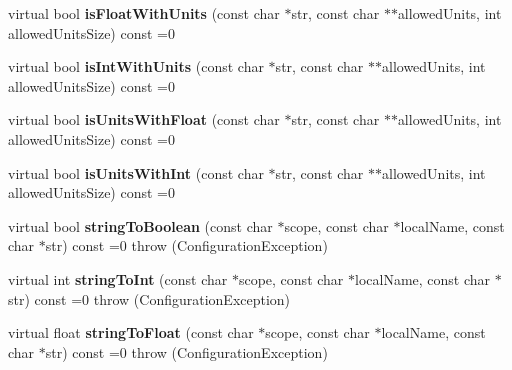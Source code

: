\begin{DoxyCompactItemize}
\item 
\hypertarget{classCONFIG4CPP__NAMESPACE_1_1Configuration_ad50807b263087f742816a6092bb72e14}{virtual bool {\bfseries is\-Float\-With\-Units} (const char $\ast$str, const char $\ast$$\ast$allowed\-Units, int allowed\-Units\-Size) const =0}\label{classCONFIG4CPP__NAMESPACE_1_1Configuration_ad50807b263087f742816a6092bb72e14}

\item 
\hypertarget{classCONFIG4CPP__NAMESPACE_1_1Configuration_a08a300bc4cee2f0f42d05911641124d6}{virtual bool {\bfseries is\-Int\-With\-Units} (const char $\ast$str, const char $\ast$$\ast$allowed\-Units, int allowed\-Units\-Size) const =0}\label{classCONFIG4CPP__NAMESPACE_1_1Configuration_a08a300bc4cee2f0f42d05911641124d6}

\item 
\hypertarget{classCONFIG4CPP__NAMESPACE_1_1Configuration_af132131731f7e2c4910d124b4de1152e}{virtual bool {\bfseries is\-Units\-With\-Float} (const char $\ast$str, const char $\ast$$\ast$allowed\-Units, int allowed\-Units\-Size) const =0}\label{classCONFIG4CPP__NAMESPACE_1_1Configuration_af132131731f7e2c4910d124b4de1152e}

\item 
\hypertarget{classCONFIG4CPP__NAMESPACE_1_1Configuration_a845b2bdfc6a74f1524750d0e002fa155}{virtual bool {\bfseries is\-Units\-With\-Int} (const char $\ast$str, const char $\ast$$\ast$allowed\-Units, int allowed\-Units\-Size) const =0}\label{classCONFIG4CPP__NAMESPACE_1_1Configuration_a845b2bdfc6a74f1524750d0e002fa155}

\item 
\hypertarget{classCONFIG4CPP__NAMESPACE_1_1Configuration_a80f6dcd2137e1fe9672a18d8ed6c22dd}{virtual bool {\bfseries string\-To\-Boolean} (const char $\ast$scope, const char $\ast$local\-Name, const char $\ast$str) const =0  throw (\-Configuration\-Exception)}\label{classCONFIG4CPP__NAMESPACE_1_1Configuration_a80f6dcd2137e1fe9672a18d8ed6c22dd}

\item 
\hypertarget{classCONFIG4CPP__NAMESPACE_1_1Configuration_a1993b784e8ac66c63dcb9ac802661dfd}{virtual int {\bfseries string\-To\-Int} (const char $\ast$scope, const char $\ast$local\-Name, const char $\ast$str) const =0  throw (\-Configuration\-Exception)}\label{classCONFIG4CPP__NAMESPACE_1_1Configuration_a1993b784e8ac66c63dcb9ac802661dfd}

\item 
\hypertarget{classCONFIG4CPP__NAMESPACE_1_1Configuration_af8ce9732bcd6a7079179b98aaaf764fc}{virtual float {\bfseries string\-To\-Float} (const char $\ast$scope, const char $\ast$local\-Name, const char $\ast$str) const =0  throw (\-Configuration\-Exception)}\label{classCONFIG4CPP__NAMESPACE_1_1Configuration_af8ce9732bcd6a7079179b98aaaf764fc}


\end{DoxyCompactItemize}
